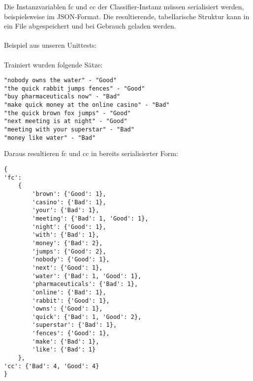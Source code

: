 \documentclass[12pt,a4paper]{scrartcl}
\begin{document}
Die Instanzvariablen fc und cc der Classifier-Instanz  m\"ussen serialisiert werden, beispielsweise im JSON-Format. Die resultierende, tabellarische Struktur kann in ein File abgespeichert und bei Gebrauch geladen werden. 
\\\\
Beispiel aus unseren Unittests:
\\\\
Trainiert wurden folgende S\"atze:
\begin{lstlisting}
"nobody owns the water" - "Good"
"the quick rabbit jumps fences" - "Good"
"buy pharmaceuticals now" -	"Bad"
"make quick money at the online casino" - "Bad"
"the quick brown fox jumps" - "Good"
"next meeting is at night" - "Good"
"meeting with your superstar" - "Bad"
"money like water" - "Bad"
\end{lstlisting}

Daraus resultieren fc und cc in bereits serialisierter Form:

\begin{lstlisting}
{
'fc':
	{
		'brown': {'Good': 1}, 
		'casino': {'Bad': 1}, 
		'your': {'Bad': 1}, 
		'meeting': {'Bad': 1, 'Good': 1}, 
		'night': {'Good': 1}, 
		'with': {'Bad': 1}, 
		'money': {'Bad': 2}, 
		'jumps': {'Good': 2}, 
		'nobody': {'Good': 1}, 
		'next': {'Good': 1}, 
		'water': {'Bad': 1, 'Good': 1}, 
		'pharmaceuticals': {'Bad': 1}, 
		'online': {'Bad': 1}, 
		'rabbit': {'Good': 1}, 
		'owns': {'Good': 1}, 
		'quick': {'Bad': 1, 'Good': 2}, 
		'superstar': {'Bad': 1}, 
		'fences': {'Good': 1}, 
		'make': {'Bad': 1}, 
		'like': {'Bad': 1}	
	}, 
'cc': {'Bad': 4, 'Good': 4}
}
\end{lstlisting}
\end{document}
